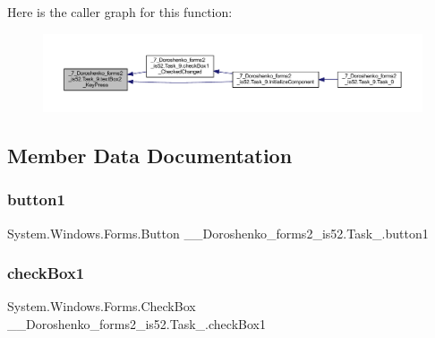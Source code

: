 Here is the caller graph for this function\+:
\nopagebreak
\begin{figure}[H]
\begin{center}
\leavevmode
\includegraphics[width=350pt]{class__7___doroshenko__forms2__is52_1_1_task__9_a2e680b59861c94a70411eeb3082e2f49_icgraph}
\end{center}
\end{figure}


\subsection{Member Data Documentation}
\hypertarget{class__7___doroshenko__forms2__is52_1_1_task__9_a1ce96f9ed31422c523cccfacfb901d71}{}\label{class__7___doroshenko__forms2__is52_1_1_task__9_a1ce96f9ed31422c523cccfacfb901d71} 
\subsubsection{\texorpdfstring{button1}{button1}}
{\footnotesize\ttfamily System.\+Windows.\+Forms.\+Button \+\_\+\_\+\+Doroshenko\+\_\+forms2\+\_\+is52.\+Task\+\_.\+button1\hspace{0.3cm}{\ttfamily [private]}}

\hypertarget{class__7___doroshenko__forms2__is52_1_1_task__9_a737be2251cf4471d667e8d37a524e87e}{}\label{class__7___doroshenko__forms2__is52_1_1_task__9_a737be2251cf4471d667e8d37a524e87e} 
\subsubsection{\texorpdfstring{check\+Box1}{checkBox1}}
{\footnotesize\ttfamily System.\+Windows.\+Forms.\+Check\+Box \+\_\+\_\+\+Doroshenko\+\_\+forms2\+\_\+is52.\+Task\+\_.\+check\+Box1\hspace{0.3cm}{\ttfamily [private]}}

